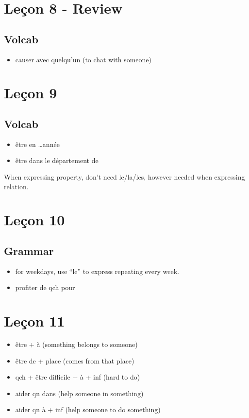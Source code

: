 \documentclass{book}
\begin{document}
\chapter{Leçon 8 - Review}
    \section{Volcab}
        \begin{itemize}
            \item causer avec quelqu'un (to chat with someone)
        \end{itemize}

\chapter{Leçon 9}
    \section{Volcab}
        \begin{itemize}
            \item être en \dots année
            \item être dans le département de
        \end{itemize}
    When expressing property, don't need le/la/les, however needed when expressing relation.

\chapter{Leçon 10}
    \section{Grammar}

        \begin{itemize}
            \item for weekdays, use ``le'' to express repeating every week.
            \item profiter de qch pour 
        \end{itemize}

\chapter{Leçon 11}
    \begin{itemize}
        \item être + à (something belongs to someone)
        \item être de + place (comes from that place)
        \item qch + être difficile + à + inf (hard to do)
        \item aider qn dans (help someone in something)
        \item aider qn à + inf (help someone to do something)
    \end{itemize}
\end{document}
